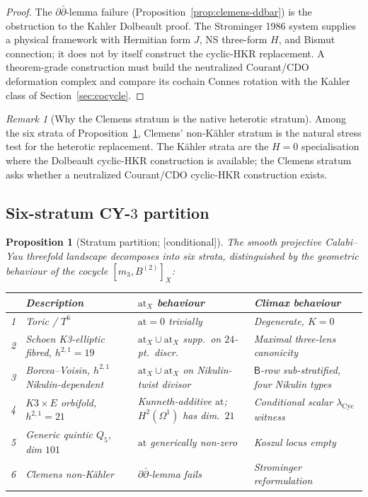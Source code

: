 \documentclass[11pt,reqno]{amsart}
\theoremstyle{plain}
\newtheorem{proposition}[theorem]{Proposition}
\theoremstyle{definition}
\theoremstyle{remark}
\newtheorem{remark}[theorem]{Remark}
\providecommand{\ClaimStatusConditional}{\textnormal{[conditional]}}
\newcommand{\sfB}{\mathsf{B}}
\newcommand{\at}{\mathrm{at}}
\begin{document}
\begin{proof}
The $\partial \bar\partial$-lemma failure (Proposition~\ref{prop:clemens-ddbar}) is the obstruction to the Kahler Dolbeault proof. The Strominger 1986 system supplies a physical framework with Hermitian form $J$, NS three-form $H$, and Bismut connection; it does not by itself construct the cyclic-HKR replacement. A theorem-grade construction must build the neutralized Courant/CDO deformation complex and compare its cochain Connes rotation with the Kahler class of Section~\ref{sec:cocycle}.
\end{proof}

\begin{remark}[Why the Clemens stratum is the native heterotic stratum]
\label{rem:clemens-heterotic}
Among the six strata of Proposition~\ref{prop:strata}, Clemens' non-K\"ahler stratum is the natural stress test for the heterotic replacement. The K\"ahler strata are the $H = 0$ specialisation where the Dolbeault cyclic-HKR construction is available; the Clemens stratum asks whether a neutralized Courant/CDO cyclic-HKR construction exists.
\end{remark}


\subsection{Six-stratum CY-$3$ partition}

\begin{proposition}[Stratum partition; \ClaimStatusConditional]
\label{prop:strata}
The smooth projective Calabi--Yau threefold landscape decomposes into six strata, distinguished by the geometric behaviour of the cocycle $[m_3, B^{(2)}]_X$:

\begin{tabular}{l l l l}
\toprule
 & Description & $\at_X$ behaviour & Climax behaviour \\
\midrule
1 & Toric / $T^6$ & $\at = 0$ trivially & Degenerate, $K = 0$ \\
2 & Schoen K3-elliptic fibred, $h^{2,1} = 19$ & $\at_X \cup \at_X$ supp.\ on $24$-pt.\ discr. & Maximal three-lens canonicity \\
3 & Borcea--Voisin, $h^{2,1}$ Nikulin-dependent & $\at_X \cup \at_X$ on Nikulin-twist divisor & $\sfB$-row sub-stratified, four Nikulin types \\
4 & $K3 \times E$ orbifold, $h^{2,1} = 21$ & Kunneth-additive $\at$; $H^2(\Omega^1)$ has dim.\ $21$ & Conditional scalar $\lambda_{\mathrm{Cyc}}$ witness \\
5 & Generic quintic $Q_5$, dim $101$ & $\at$ generically non-zero & Koszul locus empty \\
6 & Clemens non-Kähler & $\partial\bar\partial$-lemma fails & Strominger reformulation \\
\bottomrule
\end{tabular}
\end{proposition}
\end{document}
